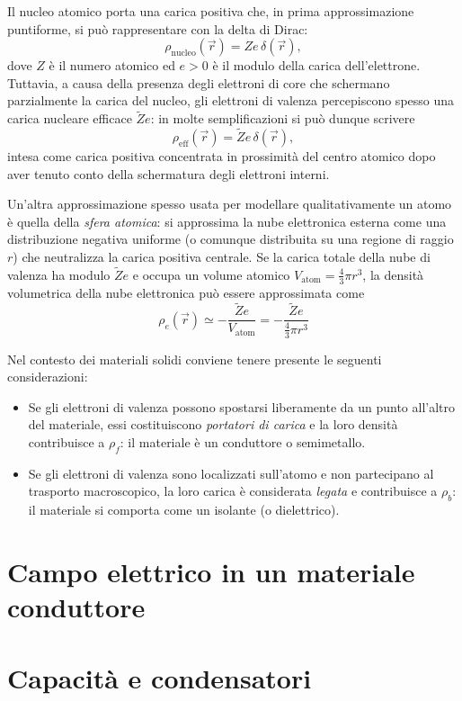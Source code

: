 \documentclass{book}
\begin{document}
Il nucleo atomico porta una carica positiva che, in prima approssimazione puntiforme, si può rappresentare con la delta di Dirac:
\[
\rho_{\mathrm{nucleo}}(\vec{r}) = Z e\,\delta(\vec{r}),
\]
dove $Z$ è il numero atomico ed $e>0$ è il modulo della carica dell'elettrone. Tuttavia, a causa della presenza degli elettroni di core che schermano parzialmente la carica del nucleo, gli elettroni di valenza percepiscono spesso una carica nucleare efficace $\tilde{Z}e$: in molte semplificazioni si può dunque scrivere
\[
\rho_{\mathrm{eff}}(\vec{r}) = \tilde{Z}e\,\delta(\vec{r}),
\]
intesa come carica positiva concentrata in prossimità del centro atomico dopo aver tenuto conto della schermatura degli elettroni interni.

Un'altra approssimazione spesso usata per modellare qualitativamente un atomo è quella della \emph{sfera atomica}: si approssima la nube elettronica esterna come una distribuzione negativa uniforme (o comunque distribuita su una regione di raggio $r$) che neutralizza la carica positiva centrale. Se la carica totale della nube di valenza ha modulo $\tilde{Z}e$ e occupa un volume atomico $V_{\mathrm{atom}}=\tfrac{4}{3}\pi r^3$, la densità volumetrica della nube elettronica può essere approssimata come
\[
\rho_{e}(\vec{r}) \simeq -\frac{\tilde{Z}e}{V_{\mathrm{atom}}} = -\frac{\tilde{Z}e}{\tfrac{4}{3}\pi r^3}
\]

Nel contesto dei materiali solidi conviene tenere presente le seguenti considerazioni:

\begin{itemize}
  \item Se gli elettroni di valenza possono spostarsi liberamente da un punto all'altro del materiale, essi costituiscono \emph{portatori di carica} e la loro densità contribuisce a $\rho_f$: il materiale è un conduttore o semimetallo.
  \item Se gli elettroni di valenza sono localizzati sull'atomo e non partecipano al trasporto macroscopico, la loro carica è considerata \emph{legata} e contribuisce a $\rho_b$: il materiale si comporta come un isolante (o dielettrico).
\end{itemize}


\section{Campo elettrico in un materiale conduttore}
\section{Capacit\`a e condensatori}
\end{document}
